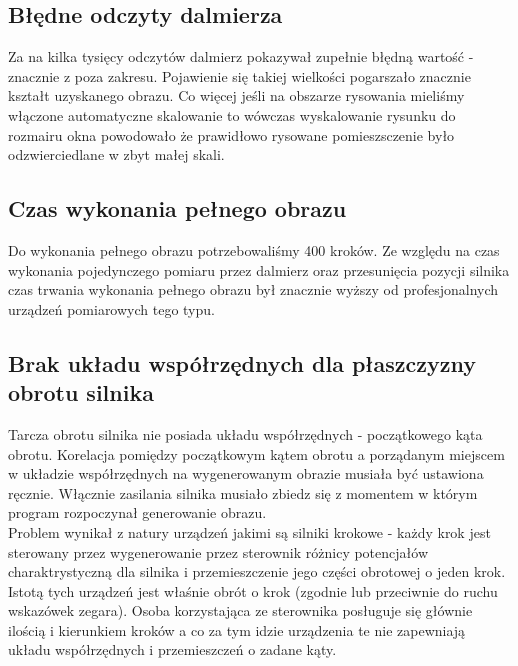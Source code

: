 \subsection {Błędne odczyty dalmierza}
Za na kilka tysięcy odczytów dalmierz pokazywał zupełnie błędną wartość - znacznie z poza zakresu. Pojawienie się takiej wielkości pogarszało znacznie kształt uzyskanego obrazu. Co więcej jeśli na obszarze rysowania mieliśmy włączone automatyczne skalowanie to wówczas wyskalowanie rysunku do rozmairu okna powodowało że prawidłowo rysowane pomieszsczenie było odzwierciedlane w zbyt małej skali.

\subsection {Czas wykonania pełnego obrazu}
Do wykonania pełnego obrazu potrzebowaliśmy 400 kroków. Ze względu na czas wykonania pojedynczego pomiaru przez dalmierz oraz przesunięcia pozycji silnika czas trwania wykonania pełnego obrazu był znacznie wyższy od profesjonalnych urządzeń pomiarowych tego typu.

\subsection {Brak układu współrzędnych dla płaszczyzny obrotu silnika}
Tarcza obrotu silnika nie posiada układu współrzędnych - początkowego kąta obrotu. Korelacja pomiędzy początkowym kątem obrotu a porządanym miejscem w układzie współrzędnych na wygenerowanym obrazie musiała być ustawiona ręcznie. Włącznie zasilania silnika musiało zbiedz się z momentem w którym program rozpoczynał generowanie obrazu.\\

Problem wynikał z natury urządzeń jakimi są silniki krokowe - każdy krok jest sterowany przez wygenerowanie przez sterownik różnicy potencjałów charaktrystyczną dla silnika i przemieszczenie jego części obrotowej o jeden krok. Istotą tych urządzeń jest właśnie obrót o krok (zgodnie lub przeciwnie do ruchu wskazówek zegara). Osoba korzystająca ze sterownika posługuje się głównie ilością i kierunkiem kroków a co za tym idzie urządzenia te nie zapewniają układu współrzędnych i przemieszczeń o zadane kąty.